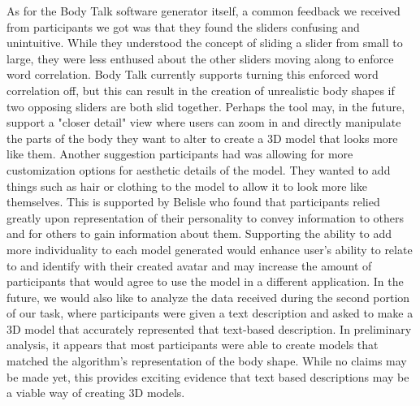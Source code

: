 \documentclass[journal]{vgtc}                %
\begin{document}
\noindent As for the Body Talk software generator itself, a common feedback we received from participants we got was that they found
the sliders confusing and unintuitive. While they understood the concept of sliding a slider from small to large, they were less
enthused about the other sliders moving along to enforce word correlation. Body Talk currently supports turning this enforced
word correlation off, but this can result in the creation of unrealistic body shapes if two opposing sliders are both slid together.
Perhaps the tool may, in the future, support a "closer detail" view where users can zoom in and directly manipulate the parts of the
body they want to alter to create a 3D model that looks more like them.
\newline\newline
\noindent
Another suggestion participants had was allowing for more customization options for aesthetic details of the model. They wanted to
add things such as hair or clothing to the model to allow it to look more like themselves. This is supported by Belisle
\cite{Belisle:2010:PM} who found that participants relied greatly upon representation of their personality to convey information
to others and for others to gain information about them\cite{WDMAS}. Supporting the ability to add more individuality to each model
generated would enhance user's ability to relate to and identify with their created avatar and may increase the amount of
participants that would agree to use the model in a different application.
\newline\newline
\noindent In the future, we would also like to analyze the data received during the second portion of our task, where participants
were given a text description and asked to make a 3D model that accurately represented that text-based description. In
preliminary analysis, it appears that most participants were able to create models that matched the algorithm's representation of the
body shape. While no claims may be made yet, this provides exciting evidence that text based descriptions may be a viable way of
creating 3D models.
\end{document}
